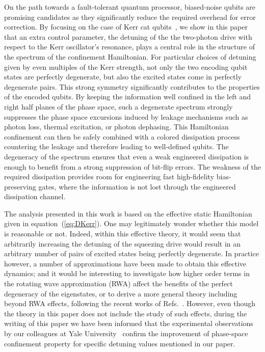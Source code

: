 \documentclass[%
 reprint,
 superscriptaddress,
 amsmath,
 amssymb,
 aps,
 pra,
 10pt
]{revtex4-2}
\begin{document}
On the path towards a fault-tolerant quantum processor, biased-noise qubits are promising candidates as they significantly reduce the required overhead for error correction. By focusing on the case of Kerr cat qubits~\cite{Puri2017,Grimm2020,Frattini-2022}, we show in this paper that an extra control parameter, the detuning of the the two-photon drive with respect to the Kerr oscillator's resonance, plays a central role in the structure of the spectrum of the confinement Hamiltonian. For particular choices of detuning given by even multiples of the Kerr strength, not only the two encoding qubit states are perfectly degenerate, but also the excited states come in perfectly degenerate pairs. This strong symmetry significantly contributes to the properties of the encoded qubits. By keeping the information well confined in the left and right half planes of the phase space, such a degenerate spectrum strongly suppresses the phase space excursions induced by leakage mechanisms such as photon loss, thermal excitation, or photon dephasing. This Hamiltonian confinement can then be safely combined with a colored dissipation process countering the leakage and therefore leading to well-defined qubits. The degeneracy of the spectrum ensures that even a weak engineered dissipation is enough to benefit from a strong suppression of bit-flip errors. The weakness of the required dissipation provides room for engineering fast high-fidelity bias-preserving gates, where the information is not lost through the engineered dissipation channel. 

The analysis presented in this work is based on the effective static Hamiltonian given in equation~(\ref{eq:DKerr}). One may legitimately wonder whether this model is reasonable or not. Indeed, within this effective theory, it would seem that arbitrarily increasing the detuning of the squeezing drive would result in an arbitrary number of pairs of excited states being perfectly degenerate. In practice however, a number of approximations have been made to obtain this effective dynamics; and it would be interesting to investigate how higher order terms in the rotating wave approximation (RWA) affect the benefits of the perfect degeneracy of the eigenstates, or to derive a more general theory including beyond RWA effects, following the recent works of Refs.~\cite{Venkatraman2022}. However, even though the theory in this paper does not include the study of such effects, during the writing of this paper we have been informed that the experimental observations by our colleagues at Yale University~\cite{RodrigoExperiment} confirm the improvement of phase-space confinement property for specific detuning values mentioned in our paper.
\end{document}

